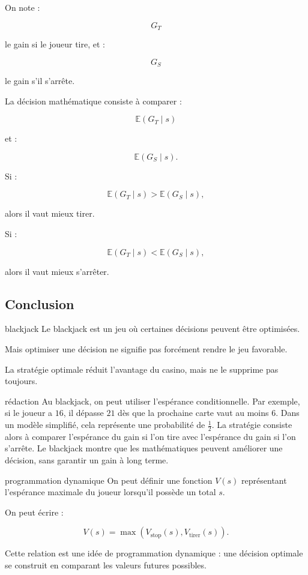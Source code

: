 \documentclass[11pt,a4paper]{article}
\newcommand{\E}{\mathbb{E}}
\begin{document}
On note :

\[
G_T
\]

le gain si le joueur tire, et :

\[
G_S
\]

le gain s'il s'arrête.

La décision mathématique consiste à comparer :

\[
\E(G_T\mid s)
\]

et :

\[
\E(G_S\mid s).
\]

Si :

\[
\E(G_T\mid s)>\E(G_S\mid s),
\]

alors il vaut mieux tirer.

Si :

\[
\E(G_T\mid s)<\E(G_S\mid s),
\]

alors il vaut mieux s'arrêter.

\subsection{Conclusion}

\begin{conclusionbox}{blackjack}
Le blackjack est un jeu où certaines décisions peuvent être optimisées.

Mais optimiser une décision ne signifie pas forcément rendre le jeu favorable.

La stratégie optimale réduit l'avantage du casino, mais ne le supprime pas toujours.
\end{conclusionbox}

\begin{oral}{rédaction}
Au blackjack, on peut utiliser l'espérance conditionnelle. Par exemple, si le joueur a $16$, il dépasse $21$ dès que la prochaine carte vaut au moins $6$. Dans un modèle simplifié, cela représente une probabilité de $\frac12$. La stratégie consiste alors à comparer l'espérance du gain si l'on tire avec l'espérance du gain si l'on s'arrête. Le blackjack montre que les mathématiques peuvent améliorer une décision, sans garantir un gain à long terme.
\end{oral}

\begin{prepa}{programmation dynamique}
On peut définir une fonction $V(s)$ représentant l'espérance maximale du joueur lorsqu'il possède un total $s$.

On peut écrire :

\[
V(s)=\max\left(V_{\text{stop}}(s),V_{\text{tirer}}(s)\right).
\]

Cette relation est une idée de programmation dynamique : une décision optimale se construit en comparant les valeurs futures possibles.
\end{prepa}
\end{document}
